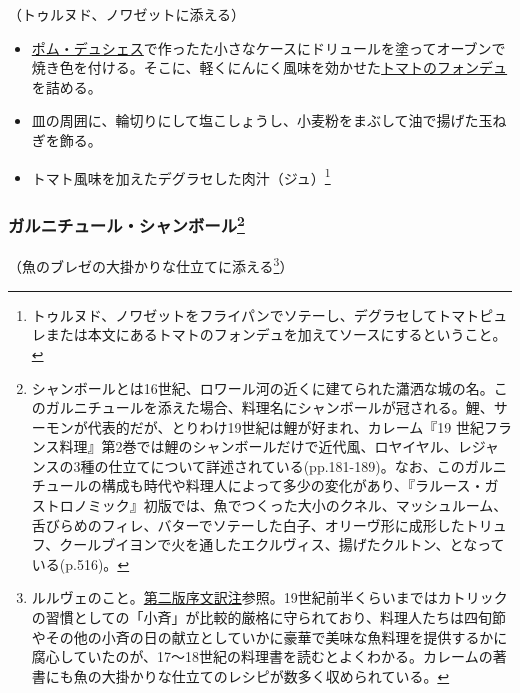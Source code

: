 \begin{recette}
（トゥルヌド、ノワゼットに添える）

\begin{itemize}
\item
  \protect\hyperlink{pommes-de-terre-duchesse}{ポム・デュシェス}で作ったた小さなケースにドリュールを塗ってオーブンで焼き色を付ける。そこに、軽くにんにく風味を効かせた\protect\hyperlink{portugaise}{トマトのフォンデュ}を詰める。
\item
  皿の周囲に、輪切りにして塩こしょうし、小麦粉をまぶして油で揚げた玉ねぎを飾る。
\item
  トマト風味を加えたデグラセした肉汁（ジュ）\footnote{トゥルヌド、ノワゼットをフライパンでソテーし、デグラセしてトマトピュレまたは本文にあるトマトのフォンデュを加えてソースにするということ。}
\end{itemize}

\hypertarget{garniture-chambord}{%
\subsubsection[ガルニチュール・シャンボール]{\texorpdfstring{ガルニチュール・シャンボール\footnote{シャンボールとは16世紀、ロワール河の近くに建てられた瀟洒な城の名。このガルニチュールを添えた場合、料理名にシャンボールが冠される。鯉、サーモンが代表的だが、とりわけ19世紀は鯉が好まれ、カレーム『19
  世紀フランス料理』第2巻では鯉のシャンボールだけで近代風、ロヤイヤル、レジャンスの3種の仕立てについて詳述されている(pp.181-189)。なお、このガルニチュールの構成も時代や料理人によって多少の変化があり、『ラルース・ガストロノミック』初版では、魚でつくった大小のクネル、マッシュルーム、舌びらめのフィレ、バターでソテーした白子、オリーヴ形に成形したトリュフ、クールブイヨンで火を通したエクルヴィス、揚げたクルトン、となっている(p.516)。}}{ガルニチュール・シャンボール}}\label{garniture-chambord}}



（魚のブレゼの大掛かりな仕立てに添える\footnote{ルルヴェのこと。\protect\hyperlink{releve}{第二版序文訳注}参照。19世紀前半くらいまではカトリックの習慣としての「小斉」が比較的厳格に守られており、料理人たちは四旬節やその他の小斉の日の献立としていかに豪華で美味な魚料理を提供するかに腐心していたのが、17〜18世紀の料理書を読むとよくわかる。カレームの著書にも魚の大掛かりな仕立てのレシピが数多く収められている。}）


\end{recette}

